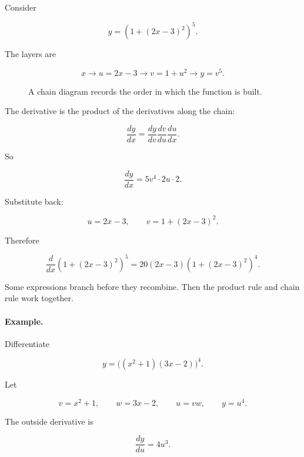 Consider

\[
y=\left(1+(2x-3)^2\right)^5.
\]

The layers are

\[
x \longrightarrow u=2x-3 \longrightarrow v=1+u^2 \longrightarrow y=v^5.
\]

\begin{figure}[h]
\centering
{}
\caption{A chain diagram records the order in which the function is built.}
\label{fig:chain-diagram}
\end{figure}

The derivative is the product of the derivatives along the chain:

\[
\frac{dy}{dx}
=
\frac{dy}{dv}\frac{dv}{du}\frac{du}{dx}.
\]

So

\[
\frac{dy}{dx}
=
5v^4\cdot 2u\cdot 2.
\]

Substitute back:

\[
u=2x-3,
\qquad
v=1+(2x-3)^2.
\]

Therefore

\[
\boxed{
\frac{d}{dx}\left(1+(2x-3)^2\right)^5
=
20(2x-3)\left(1+(2x-3)^2\right)^4.
}
\]

Some expressions branch before they recombine.  Then the product rule and chain rule work together.

\paragraph{Example.}
Differentiate

\[
y=\bigl((x^2+1)(3x-2)\bigr)^4.
\]

Let

\[
v=x^2+1,
\qquad
w=3x-2,
\qquad
u=vw,
\qquad
y=u^4.
\]

The outside derivative is

\[
\frac{dy}{du}=4u^3.
\]

